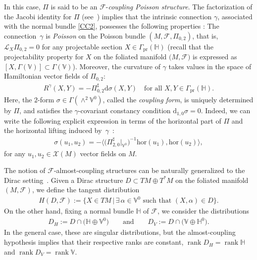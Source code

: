 \documentclass[pdftex]{sigma}
\numberwithin{equation}{section}
\begin{document}
In this case, $\Pi$ is said to be an $\mathcal{F}$-\emph{coupling Poisson structure}.
The factorization of the Jacobi identity for $\Pi$ (see~\cite[equations (6.4)--(6.6)]{JVYV-14}) implies that the intrinsic connection $\gamma$, associated with the normal bundle \eqref{CC2}, possesses the following properties \cite{Va-04, Vo-01}: The connection~$\gamma$ is \emph{Poisson} on the Poisson bundle $(M,\mathcal{F},\Pi_{0,2})$, that is, $\mathcal{L}_{X}\Pi_{0,2}=0$ for any projectable section $X\in\Gamma_{\operatorname*{pr}}(\mathbb{H})$ (recall that the projectability property for $X$ on the foliated manifold $(M,\mathcal{F)}$ is expressed as $[X,\Gamma(\mathbb{V})]\subset\Gamma(\mathbb{V})$). Moreover, the curvature of $\gamma$ takes values in the space of Hamiltonian vector f\/ields of $\Pi_{0,2}$:
\begin{gather}\label{Cur}
R^{\gamma}(X,Y)=-\Pi_{0,2}^{\sharp}\mathrm{d}\sigma(X,Y)\quad \mbox{for all } X,Y\in\Gamma_{\operatorname*{pr}}(\mathbb{H}).
\end{gather}
Here, the $2$-form $\sigma\in\Gamma(\wedge^{2}\mathbb{V}^{0})$, called the \emph{coupling form}, is uniquely determined by $\Pi$, and satisf\/ies the $\gamma$-covariant constancy condition $\mathrm{d}_{1,0}\sigma=0$. Indeed, we can write the following explicit expression in terms of the horizontal part of $\Pi$ and the horizontal lifting induced by~$\gamma$~\cite{Vo-01}:
\begin{gather*}
\sigma (u_1,u_2)=-\big\langle \big(\Pi^\sharp_{2,0}\big|_{\mathbb{V}^0}\big)^{-1} \mathrm{hor}(u_1),\mathrm{hor}(u_2)\big\rangle,
\end{gather*}
for any $u_1,u_2\in\mathcal{X}(M)$ vector f\/ields on $M$.

The notion of $\mathcal{F}$-almost-coupling structures can be naturally generalized to the Dirac set\-ting~\cite{Va-06}. Given a Dirac structure $D\subset TM\oplus T^{\ast}M$ on the foliated manifold $(M,\mathcal{F})$, we def\/ine the tangent distribution
\begin{gather*}
H(D,\mathcal{F}):=\big\{X\in TM\,|\,\exists\,\alpha\in\mathbb{V}^{0}\mbox{ such that }(X,\alpha)\in D\big\}.
\end{gather*}
On the other hand, f\/ixing a normal bundle $\mathbb{H}$ of $\mathcal{F}$, we
consider the distributions
\begin{gather*}
D_{H}:=D\cap\big(\mathbb{H}\oplus\mathbb{V}^{0}\big)\qquad\mbox{and}\qquad D_{V}:=D\cap\big(\mathbb{V}\oplus\mathbb{H}^{0}\big).
\end{gather*}
In the general case, these are singular distributions, but the almost-coupling hypothesis implies that their respective ranks are constant, $\operatorname{rank}D_{H}=\operatorname{rank} \mathbb{H}$ and $\operatorname{rank}D_{V}=\operatorname{rank} \mathbb{V}$.
\end{document}
